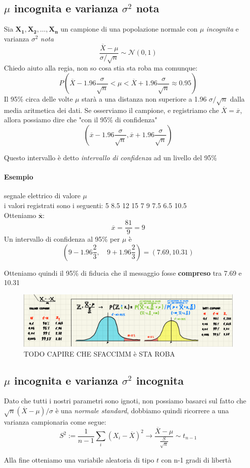 \documentclass[]{article}
\begin{document}
    \subsection{$\mu$ incognita e varianza  $\sigma^2$ nota}
    Sia $\boldsymbol{X_1, X_2, \ldots, X_n}$ un campione di una popolazione normale con $\mu$ \textit{incognita} e varianza $\sigma^2$ \textit{nota}
    \[ \frac{\overline{X} - \mu}{\sigma / \sqrt{n}} \sim \mathcal{N}(0,1) \]
    Chiedo aiuto alla regia, non so cosa stia sta roba ma comunque:
    \[ P \left( \overline{X} - 1.96 \frac{\sigma}{\sqrt{n}} < \mu < \overline{X} + 1.96 \frac{\sigma}{\sqrt{n}} \approx 0.95 \right) \]
    Il 95\% circa delle volte $\mu$ starà a una distanza non superiore a 1.96 $\sigma / \sqrt{n}$ dalla
    media aritmetica dei dati. Se osserviamo il campione, e registriamo che $\overline{X} = \overline{x}$,
    allora possiamo dire che "con il 95\% di confidenza"
    \[ \left( \overline{x} - 1.96 \frac{\sigma}{\sqrt{n}}, \overline{x} + 1.96 \frac{\sigma}{\sqrt{n}} \right) \]
    \centerline{Questo intervallo è detto \textit{intervallo di confidenza} ad un livello del 95\%}
    \paragraph{Esempio} segnale elettrico di valore $\mu$ \\
    i valori registrati sono i seguenti: 5 8.5 12 15 7 9 7.5 6.5 10.5 \\
    Otteniamo $\boldsymbol{\overline{x}}$:
    \[ \overline{x} = \frac{81}{9} = 9 \]
    Un intervallo di confidenza al 95\% per $\mu$ è
    \[ \left( 9 - 1.96 \frac{2}{3}, \quad 9 + 1.96 \frac{2}{3}\right) = (7.69, 10.31) \]
    \centerline{Otteniamo quindi il 95\% di fiducia che il messaggio fosse \textbf{compreso} tra 7.69 e 10.31}
    \begin{figure}[H]
        \caption{TODO CAPIRE CHE SFACCIMM è STA ROBA}
        \includegraphics[width=\textwidth]{images/boh.png}
    \end{figure}
    \subsection{$\mu$ incognita e varianza  $\sigma^2$ incognita}
    Dato che tutti i nostri parametri sono ignoti, non possiamo basarci sul fatto che $\sqrt{n}(\overline{X} - \mu) / \sigma$ è una \textit{normale standard}, dobbiamo quindi ricorrere a una varianza campionaria come segue:
    \[ S^2 := \frac{1}{n-1} \sum_{i}^{} (X_i - \overline{X})^2 \longrightarrow \frac{\overline{X} - \mu}{\frac{S}{\sqrt{n}}} \sim t_{n-1}\]
    \centerline{Alla fine otteniamo una variabile aleatoria di tipo $t$ con n-1 gradi di libertà}
\end{document}
